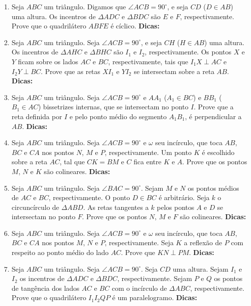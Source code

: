 \documentclass{article}
\newcommand{\dica}{\textbf{Dicas:}}
\newcommand{\iniTri}{Seja $ABC$ um triângulo}
\begin{document}
\begin{multicols}{2}
\begin{enumerate}
    \item \iniTri. Digamos que $\angle ACB=90^{\circ}$, e seja $CD$ ($D\in AB$) uma altura. Os incentros de $\Delta ADC$ e $\Delta BDC$ são $E$ e $F$, respectivamente. Prove que o quadrilátero $ABFE$ é cíclico. \dica %
    
    \item  \iniTri. Seja $\angle ACB=90^{\circ}$, e seja $CH$ ($H\in AB$) uma altura. Os incentros de $\Delta AHC$ e $\Delta BHC$ são $I_1$ e $I_2$, respectivamente. Os pontos $X$ e $Y$ ficam sobre os lados $AC$ e $BC$, respectivamente, tais que $I_1X\perp AC$ e $I_2Y\perp BC$. Prove que as retas $XI_1$ e $YI_2$ se intersectam sobre a reta $AB$. \dica %
    
    \item \iniTri. Seja $\angle ACB=90^{\circ}$ e $AA_1$ ($A_1\in BC$) e $BB_1$ ($B_1\in AC$) bissetrizes internas, que se intersectam no ponto $I$. Prove que a reta definida por $I$ e pelo ponto médio do segmento $A_1B_1$, é perpendicular a $AB$. \dica %
    
    \item \iniTri. Seja $\angle ACB=90^{\circ}$ e $\omega$ seu incírculo, que toca $AB$, $BC$ e $CA$ nos pontos $N$, $M$ e $P$, respectivamente. Um ponto $K$ é escolhido sobre a reta $AC$, tal que $CK=BM$ e $C$ fica entre $K$ e $A$. Prove que os pontos $M$, $N$ e $K$ são colineares. \dica %
    
    \item \iniTri. Seja $\angle BAC=90^{\circ}$. Sejam $M$ e $N$ os pontos médios de $AC$ e $BC$, respectivamente. O ponto $D\in BC$ é arbitrário. Seja $k$ o circuncírculo de $\Delta ABD$. As retas tangentes a $k$ pelos pontos $A$ e $D$ se intersectam no ponto $F$. Prove que os pontos $N$, $M$ e $F$ são colineares. \dica %
    
    \item \iniTri. Seja $\angle ACB=90^{\circ}$ e $\omega$ seu incírculo, que toca $AB$, $BC$ e $CA$ nos pontos $M$, $N$ e $P$, respectivamente. Seja $K$ a reflexão de $P$ com respeito ao ponto médio do lado $AC$. Prove que $KN\perp PM$. \dica %
    
    \item \iniTri. Seja $\angle ACB=90^{\circ}$. Seja $CD$ uma altura. Sejam $I_1$ e $I_2$ os incentros de $\Delta ADC$ e $\Delta BDC$, respectivamente. Sejam $P$ e $Q$ os pontos de tangência dos lados $AC$ e $BC$ com o incírculo de $\Delta ABC$, respectivamente. Prove que o quadrilátero $I_1I_2QP$ é um paralelogramo. \dica %
    

\end{enumerate}
\end{multicols}
\end{document}

